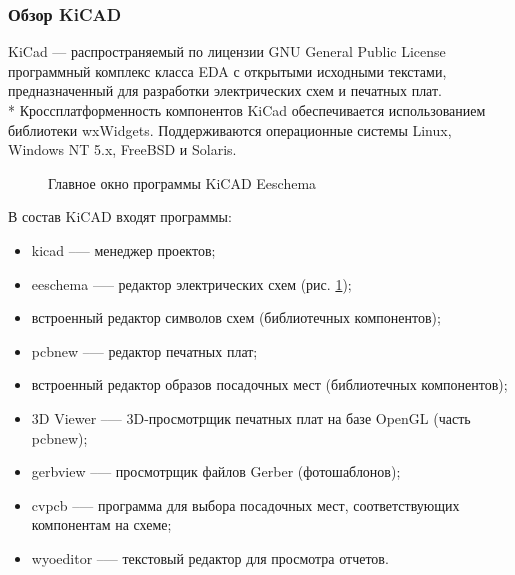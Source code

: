 \subsubsection{Обзор KiCAD}
\begin{par}
KiCad --- распространяемый по лицензии GNU General Public License программный
комплекс класса EDA с открытыми исходными текстами, предназначенный для разработки
электрических схем и печатных плат. \\*
Кроссплатформенность компонентов KiCad обеспечивается использованием библиотеки wxWidgets.
Поддерживаются операционные системы Linux, Windows NT 5.x, FreeBSD и Solaris.
\begin{figure}[h]
	\caption{Главное окно программы KiCAD Eeschema}
	\label{img:kicad}
\end{figure}
\end{par}

\begin{par}
В состав KiCAD входят программы:
    \begin{itemize}
        \item{}kicad --— менеджер проектов;
        \item{}eeschema —-- редактор электрических схем (рис. \ref{img:kicad});
        \item{}встроенный редактор символов схем (библиотечных компонентов);
        \item{}pcbnew --— редактор печатных плат;
        \item{}встроенный редактор образов посадочных мест (библиотечных компонентов);
        \item{}3D Viewer --— 3D-просмотрщик печатных плат на базе OpenGL (часть pcbnew);
        \item{}gerbview --— просмотрщик файлов Gerber (фотошаблонов);
        \item{}cvpcb --— программа для выбора посадочных мест, соответствующих компонентам на схеме;
        \item{}wyoeditor --— текстовый редактор для просмотра отчетов.
    \end{itemize}
\end{par}


